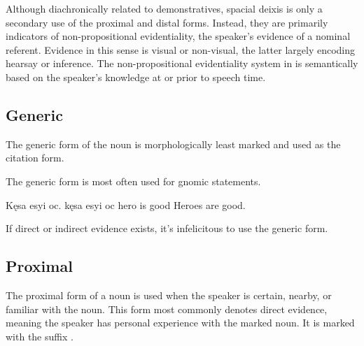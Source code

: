 Although diachronically related to demonstratives, spacial deixis is only a secondary use of the proximal and distal forms. Instead, they are primarily indicators of non-propositional evidentiality,  the speaker's evidence of a nominal referent. Evidence in this sense is visual or non-visual, the latter largely encoding hearsay or inference. The non-propositional evidentiality system in \langname{} is semantically based on the speaker's knowledge at or prior to speech time. 

\subsection{Generic}
The generic form of the noun is morphologically least marked and used as the citation form.

The generic form is most often used for gnomic statements.

\begin{example}
    \script Kęsa esyi oc.
    \bits kęsa esyi oc
    \gloss hero is good
    \tr Heroes are good.
\end{example}



If direct or indirect evidence exists, it's infelicitous to use the generic form.

\subsection{Proximal}
The proximal form of a noun is used when the speaker is certain, nearby, or familiar with the noun.
This form most commonly denotes direct evidence, meaning the speaker has personal experience with the marked noun. It is marked with the suffix . 

